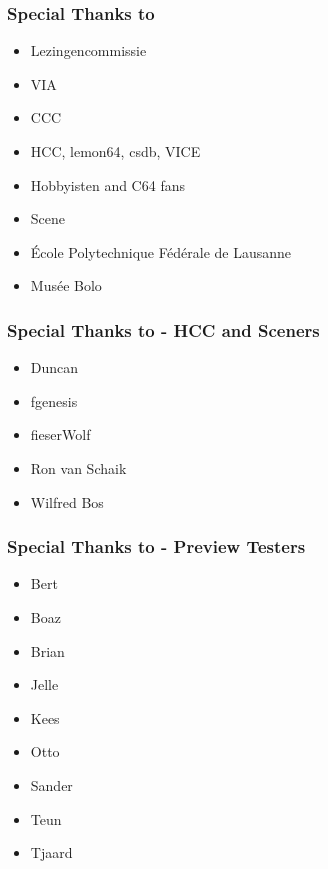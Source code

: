 \begin{frame}[noframenumbering]
\frametitle{Special Thanks to}

\begin{itemize}
\item Lezingencommissie
\item VIA
\item CCC
\item HCC, lemon64, csdb, VICE
\item Hobbyisten and C64 fans
\item Scene
\item \'Ecole Polytechnique F\'ed\'erale de Lausanne
\item Mus\'ee Bolo
\end{itemize}

\end{frame}


\begin{frame}[noframenumbering]
\frametitle{Special Thanks to - HCC and Sceners}

\begin{itemize}
\item Duncan
\item fgenesis
\item fieserWolf
\item Ron van Schaik
\item Wilfred Bos
\end{itemize}

\end{frame}


\begin{frame}[noframenumbering]
\frametitle{Special Thanks to - Preview Testers}

\begin{itemize}
\item Bert
\item Boaz
\item Brian
\item Jelle
\item Kees
\item Otto
\item Sander
\item Teun
\item Tjaard
\end{itemize}

\end{frame}

